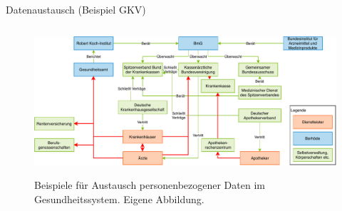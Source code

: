 \documentclass[aspectratio=169,t]{beamer}
\begin{document}
\begin{frame}{Datenaustausch (Beispiel GKV)}
   \begin{figure}[h!]
    \includegraphics[height=5.5cm]{Bilder/DatenfluesseGesundheitssystem.pdf}
     \caption{Beispiele für Austausch personenbezogener Daten im Gesundheitssystem. Eigene Abbildung.}
   \end{figure}
\end{frame}
\end{document}
